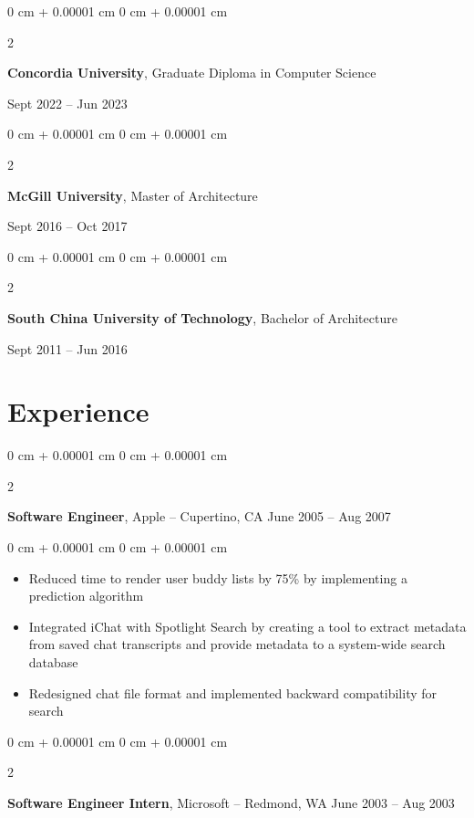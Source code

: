 \documentclass[10pt, letterpaper]{article}
\newenvironment{highlights}{
    \begin{itemize}[
        topsep=0.10 cm,
        parsep=0.10 cm,
        partopsep=0pt,
        itemsep=0pt,
        leftmargin=0 cm + 10pt
    ]
}{
    \end{itemize}
} %
\newenvironment{onecolentry}{
    \begin{adjustwidth}{
        0 cm + 0.00001 cm
    }{
        0 cm + 0.00001 cm
    }
}{
    \end{adjustwidth}
} %
\newenvironment{twocolentry}[2][]{
    \onecolentry
    \def\secondColumn{#2}
    \setcolumnwidth{\fill, 4.5 cm}
    \begin{paracol}{2}
}{
    \switchcolumn \raggedleft \secondColumn
    \end{paracol}
    \endonecolentry
} %
\begin{document}
        \begin{twocolentry}{
            Sept 2022 – Jun 2023
        }
            \textbf{Concordia University}, Graduate Diploma in Computer Science
        \end{twocolentry}

        \begin{twocolentry}{
            Sept 2016 – Oct 2017
        }
            \textbf{McGill University}, Master of Architecture
        \end{twocolentry}

        \begin{twocolentry}{
            Sept 2011 – Jun 2016
        }
            \textbf{South China University of Technology}, Bachelor of Architecture
        \end{twocolentry}


    \section{Experience}

        \begin{twocolentry}{
            June 2005 – Aug 2007
        }
            \textbf{Software Engineer}, Apple -- Cupertino, CA\end{twocolentry}

        \vspace{0.10 cm}
        \begin{onecolentry}
            \begin{highlights}
                \item Reduced time to render user buddy lists by 75\% by implementing a prediction algorithm
                \item Integrated iChat with Spotlight Search by creating a tool to extract metadata from saved chat transcripts and provide metadata to a system-wide search database
                \item Redesigned chat file format and implemented backward compatibility for search
            \end{highlights}
        \end{onecolentry}


        \vspace{0.2 cm}

        \begin{twocolentry}{
            June 2003 – Aug 2003
        }
            \textbf{Software Engineer Intern}, Microsoft -- Redmond, WA\end{twocolentry}
\end{document}
